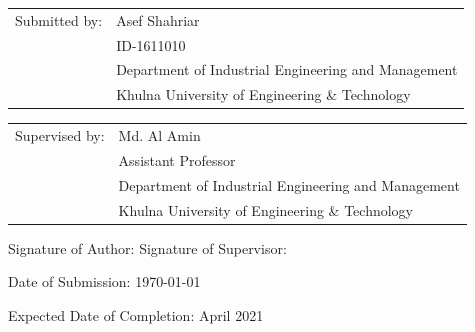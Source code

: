 \documentclass[fontsize=11pt,paper=a4]{scrartcl}
\newcommand{\asef}{Asef Shahriar}
\begin{document}
\begin{spacing}{1}
\begin{titlepage}
\begin{flushleft}
            \vspace{\baselineskip}
            \begin{tabular}{@{}ll}
                Submitted by: & \asef\\
                & ID-1611010\\
                & Department of Industrial Engineering and Management\\
                & Khulna University of Engineering \& Technology
            \end{tabular}
            \begin{tabular}{@{}ll}
                Supervised by: & Md. Al Amin \\
                & Assistant Professor\\
                & Department of Industrial Engineering and Management\\
                & Khulna University of Engineering \& Technology
            \end{tabular}
         \vfill
            Signature of Author: 
            Signature of Supervisor: \makebox[2.5in]{
                \begin{minipage}[t]{150pt}
                \end{minipage}
            }

            \vspace{\baselineskip}
            Date of Submission: \today

            \vspace{\baselineskip}
            Expected Date of Completion: April 2021

        \end{flushleft}
    \end{titlepage}
\end{spacing}
\end{document}
